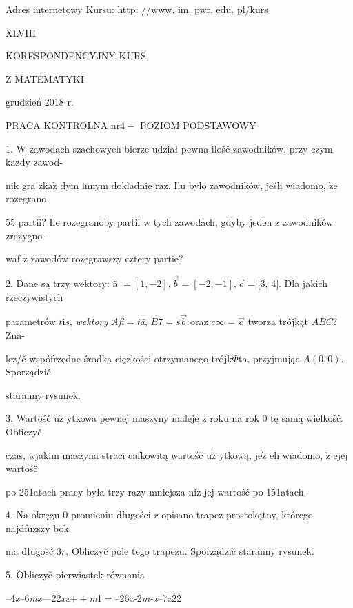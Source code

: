 \documentclass[a4paper,12pt]{article}
\begin{document}
Adres internetowy Kursu: http: //www. im. pwr. edu. pl/kurs







XLVIII

KORESPONDENCYJNY KURS

Z MATEMATYKI

grudzień 2018 r.

PRACA KONTROLNA $\mathrm{n}\mathrm{r} 4-$ POZIOM PODSTAWOWY

1. $\mathrm{W}$ zawodach szachowych bierze udział pewna ilośč zawodników, przy czym $\mathrm{k}\mathrm{a}\dot{\mathrm{z}}\mathrm{d}\mathrm{y}$ zawod-

nik gra $\mathrm{z}\mathrm{k}\mathrm{a}\dot{\mathrm{z}}$ dym innym dokladnie $\mathrm{r}\mathrm{a}\mathrm{z}$. Ilu bylo zawodników, jeśli wiadomo, $\dot{\mathrm{z}}\mathrm{e}$ rozegrano

55 partii? Ile rozegranoby partii $\mathrm{w}$ tych zawodach, gdyby jeden $\mathrm{z}$ zawodników zrezygno-

waf $\mathrm{z}$ zawodów rozegrawszy cztery partie?

2. Dane są trzy wektory: ã $= [1,-2], \vec{b}= [-2,-1], \vec{c}= [3$, 4$]$. Dla jakich rzeczywistych

parametrów $t\mathrm{i}s$, {\it wektory Afi}$=${\it tã}, $\overline{B}7=s\vec{b}$ oraz $c\infty=\vec{c}$ tworza trójkąt $ABC$? Zna-

lez/č wspófrzędne środka cięzkości otrzymanego trójk$\Phi$ta, przyjmując $A(0,0)$. Sporządzič

staranny rysunek.

3. Wartośč $\mathrm{u}\dot{\mathrm{z}}$ ytkowa pewnej maszyny maleje $\mathrm{z}$ roku na rok $0$ tę samą wielkośč. Obliczyč

czas, wjakim maszyna straci cafkowitą wartośč $\mathrm{u}\dot{\mathrm{z}}$ ytkową, $\mathrm{j}\mathrm{e}\dot{\mathrm{z}}$ eli wiadomo, $\dot{\mathrm{z}}$ ejej wartośč

po 251atach pracy była trzy razy mniejsza $\mathrm{n}\mathrm{i}\dot{\mathrm{z}}$ jej wartośč po 151atach.

4. Na okręgu $0$ promieniu dfugości $r$ opisano trapez prostokątny, którego najdfuzszy bok

ma długośč $3r$. Obliczyč pole tego trapezu. Sporządzič staranny rysunek.

5. Obliczyč pierwiastek równania

--4{\it x}--6{\it mx}---22{\it xx}$++${\it m}1$=$--26{\it x}-2{\it m-x}--7{\it x}22
\end{document}
